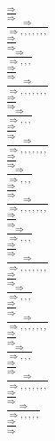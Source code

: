 \documentclass[11pt]{article}
\begin{document}
\begin{center}
\bigskip
\\$\frac{\Rightarrow }{\Rightarrow }$
\bigskip
\\$\frac{\Rightarrow }{\Rightarrow , , , , , , , }$
\bigskip
\\$\frac{\Rightarrow }{\Rightarrow }$
\bigskip
\\$\frac{\Rightarrow }{\Rightarrow , , , }$
\bigskip
\\$\frac{\Rightarrow }{\Rightarrow }$
\bigskip
\\$\frac{\Rightarrow }{\Rightarrow , , , , , , , }$
\bigskip
\\$\frac{\Rightarrow }{\Rightarrow }$
\bigskip
\\$\frac{\Rightarrow }{\Rightarrow , , , }$
\bigskip
\\$\frac{\Rightarrow }{\Rightarrow }$
\bigskip
\\$\frac{\Rightarrow }{\Rightarrow , , , , , , , }$
\bigskip
\\$\frac{\Rightarrow }{\Rightarrow }$
\bigskip
\\$\frac{\Rightarrow }{\Rightarrow , , , }$
\bigskip
\\$\frac{\Rightarrow }{\Rightarrow }$
\bigskip
\\$\frac{\Rightarrow }{\Rightarrow , , , , , , , }$
\bigskip
\\$\frac{\Rightarrow }{\Rightarrow }$
\bigskip
\\$\frac{\Rightarrow }{\Rightarrow , , , }$
\bigskip
\\$\frac{\Rightarrow }{\Rightarrow }$
\bigskip
\\$\frac{\Rightarrow }{\Rightarrow , , , , , , , }$
\bigskip
\\$\frac{\Rightarrow }{\Rightarrow }$
\bigskip
\\$\frac{\Rightarrow }{\Rightarrow , , , }$
\bigskip
\\$\frac{\Rightarrow }{\Rightarrow }$
\bigskip
\\$\frac{\Rightarrow }{\Rightarrow , , , , , , , }$
\bigskip
\\$\frac{\Rightarrow }{\Rightarrow }$
\bigskip
\\$\frac{\Rightarrow }{\Rightarrow , , , }$
\bigskip
\\$\frac{\Rightarrow }{\Rightarrow }$
\bigskip
\\$\frac{\Rightarrow }{\Rightarrow , , , , , , , }$
\bigskip
\\$\frac{\Rightarrow }{\Rightarrow }$
\bigskip
\\$\frac{\Rightarrow }{\Rightarrow , , , , , }$
\bigskip
\\$\frac{\Rightarrow }{\Rightarrow }$

\end{center}
\end{document}
